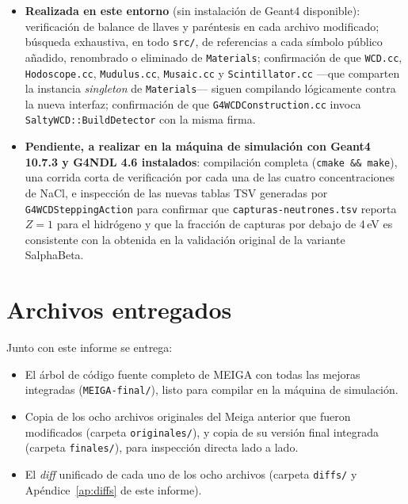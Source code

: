 \documentclass[11pt,a4paper]{article}
\newcommand{\codigo}[1]{\nolinkurl{#1}}
\begin{document}
\begin{itemize}
  \item \textbf{Realizada en este entorno} (sin instalación de Geant4
    disponible): verificación de balance de llaves y paréntesis en cada
    archivo modificado; búsqueda exhaustiva, en todo \codigo{src/}, de
    referencias a cada símbolo público añadido, renombrado o eliminado de
    \codigo{Materials}; confirmación de que \codigo{WCD.cc},
    \codigo{Hodoscope.cc}, \codigo{Mudulus.cc}, \codigo{Musaic.cc} y
    \codigo{Scintillator.cc} —que comparten la instancia \emph{singleton}
    de \codigo{Materials}— siguen compilando lógicamente contra la nueva
    interfaz; confirmación de que \codigo{G4WCDConstruction.cc} invoca
    \codigo{SaltyWCD::BuildDetector} con la misma firma.
  \item \textbf{Pendiente, a realizar en la máquina de simulación con
    Geant4 10.7.3 y G4NDL 4.6 instalados}: compilación completa
    (\codigo{cmake && make}), una corrida corta de verificación por cada
    una de las cuatro concentraciones de NaCl, e inspección de las nuevas
    tablas TSV generadas por \codigo{G4WCDSteppingAction} para confirmar
    que \codigo{capturas-neutrones.tsv} reporta $Z=1$ para el hidrógeno y
    que la fracción de capturas por debajo de 4\,eV es consistente con la
    obtenida en la validación original de la variante SalphaBeta.
\end{itemize}

\section{Archivos entregados}

Junto con este informe se entrega:

\begin{itemize}
  \item El árbol de código fuente completo de MEIGA con todas las mejoras
    integradas (\codigo{MEIGA-final/}), listo para compilar en la máquina
    de simulación.
  \item Copia de los ocho archivos originales del Meiga anterior que
    fueron modificados (carpeta \codigo{originales/}), y copia de su
    versión final integrada (carpeta \codigo{finales/}), para inspección
    directa lado a lado.
  \item El \emph{diff} unificado de cada uno de los ocho archivos
    (carpeta \codigo{diffs/} y Apéndice~\ref{ap:diffs} de este informe).
\end{itemize}
\end{document}
